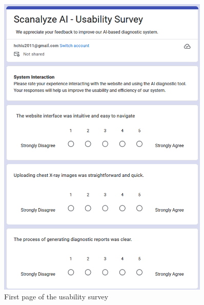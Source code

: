 \documentclass[12pt, titlepage]{article}
\begin{document}
\pagebreak
\begin{figure}
    \centering
    \begin{minipage}{0.45\textwidth}
        \centering
        \includegraphics[width=0.9\textwidth]{usersurvey1.png}
        \caption{First page of the usability survey}
    \end{minipage}\hfill
    \begin{minipage}{0.45\textwidth}
        \centering

\end{minipage}
\end{figure}
\end{document}
